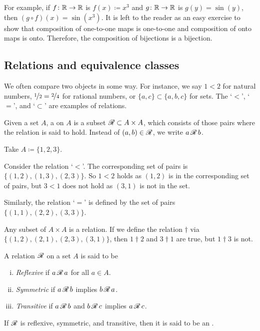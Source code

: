 For example, if $f \colon {\mathbb{R}} \to {\mathbb{R}}$ is $f(x)\coloneqq x^3$ and $g \colon {\mathbb{R}} \to {\mathbb{R}}$
is $g(y) = \sin(y)$, then $(g \circ f)(x) = \sin(x^3)$.
It is left to the reader as an easy exercise
to show that composition of one-to-one maps is
one-to-one and composition of onto maps is onto.
Therefore, the composition of bijections is a bijection.

\subsection{Relations and equivalence classes}

We often compare two objects in some way.  For instance, we say $1 < 2$
for natural numbers, $\nicefrac{1}{2} = \nicefrac{2}{4}$ for rational
numbers, or $\{ a,c \} \subset \{ a,b,c \}$ for sets.  The `$<$', `$=$', and
`$\subset$' are examples of
relations.

\begin{defn}
Given a set $A$, a \emph{} on $A$
is a subset ${\mathscr{R}} \subset A \times A$,
which consists of those pairs where the relation is said to hold.
Instead of $(a,b) \in {\mathscr{R}}$, we write
$a \, {\mathscr{R}} \, b$.
\end{defn}

\begin{example}
Take $A \coloneqq \{ 1,2,3 \}$.

Consider the relation `$<$'.  The corresponding set 
of pairs is $\bigl\{ (1,2), (1,3), (2,3) \bigr\}$.  So $1 < 2$ holds as $(1,2)$
is in the corresponding set of pairs, but $3 < 1$ does not hold as $(3,1)$ is
not in the set.

Similarly, the relation `$=$'
is defined by the set of pairs $\bigl\{ (1,1), (2,2), (3,3) \big\}$.

Any subset of $A \times A$ is a relation.  If we define the relation
$\dagger$ via $\bigl\{ (1,2), (2,1), (2,3), (3,1) \bigr\}$, then $1 \dagger 2$ and
$3 \dagger 1$ are
true, but $1 \dagger 3$ is not.
\end{example}

\begin{defn}
\pagebreak[2]
A relation
${\mathscr{R}}$ on a set $A$ is said to be
\begin{enumerate}[(i)]
\item
\emph{Reflexive} if $a\, {\mathscr{R}} \, a$ for
all $a \in A$.
\item
\emph{Symmetric} if $a\, {\mathscr{R}} \, b$ implies
$b \, {\mathscr{R}} \, a$.
\item
\emph{Transitive} if $a\, {\mathscr{R}} \, b$ and
$b \, {\mathscr{R}} \, c$ implies $a\, {\mathscr{R}} \, c$.
\end{enumerate}
If ${\mathscr{R}}$ is reflexive, symmetric, and transitive, then it is said to be
an \emph{}.
\end{defn}

